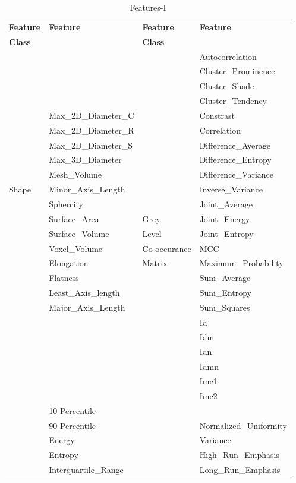 \documentclass[10pt,journal,compsoc]{IEEEtran}
\begin{document}

\begin{table}[!b]
\scriptsize
\centering
\caption{Features-I}
\label{tb3}
\begin{tabular}{| l | l | l | l |}
\hline
\textbf{Feature} & \textbf{Feature} & \textbf{Feature} & \textbf{Feature}\\
\textbf{Class}&&\textbf{Class}&\\
\hline
& &&Autocorrelation\\
&&&Cluster\_Prominence\\
&&&Cluster\_Shade\\
&&&Cluster\_Tendency\\
&Max\_2D\_Diameter\_C&&Constrast\\
&Max\_2D\_Diameter\_R&&Correlation\\
&Max\_2D\_Diameter\_S&&Difference\_Average\\
&Max\_3D\_Diameter&&Difference\_Entropy\\
&Mesh\_Volume&&Difference\_Variance\\
Shape&Minor\_Axis\_Length&&Inverse\_Variance\\
&Sphercity&&Joint\_Average\\
&Surface\_Area&Grey&Joint\_Energy\\
&Surface\_Volume&Level&Joint\_Entropy\\
&Voxel\_Volume&Co-occurance&MCC\\
&Elongation &Matrix&Maximum\_Probability\\
&Flatness&&Sum\_Average\\
&Least\_Axis\_length&&Sum\_Entropy\\
&Major\_Axis\_Length&&Sum\_Squares\\
&&&Id\\
&&&Idm\\
&&&Idn\\
&&&Idmn\\
&&&Imc1\\
&&&Imc2\\
\hline
&10 Percentile&&\\
&90 Percentile&&Normalized\_Uniformity\\
&Energy&&Variance\\
&Entropy&&High\_Run\_Emphasis\\
&Interquartile\_Range&&Long\_Run\_Emphasis\\

\end{tabular}
\end{table}
\end{document}
